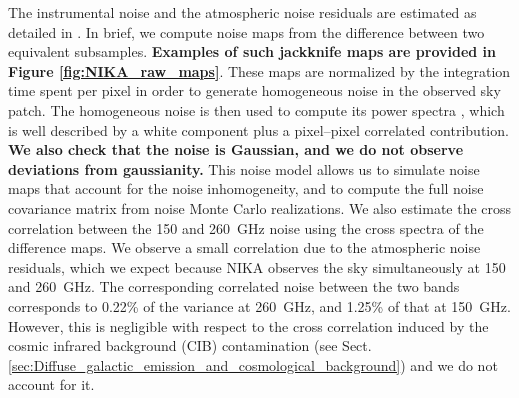 \documentclass[twocolumn,traditabstract]{aa}
\begin{document}
The instrumental noise and the atmospheric noise residuals are estimated as detailed in \cite{Adam2016}. In brief, we compute noise maps from the difference between two equivalent subsamples. {\bf Examples of such jackknife maps are provided in Figure \ref{fig:NIKA_raw_maps}}. These maps are normalized by the integration time spent per pixel in order to generate homogeneous noise in the observed sky patch. The homogeneous noise is then used to compute its power spectra \cite[using the POKER software,][]{Ponthieu2011}, which is well described by a white component plus a pixel--pixel correlated contribution. {\bf We also check that the noise is Gaussian, and we do not observe deviations from gaussianity.} This noise model allows us to simulate noise maps that account for the noise inhomogeneity, and to compute the full noise covariance matrix from noise Monte Carlo realizations. We also estimate the cross correlation between the 150 and 260~GHz noise using the cross spectra of the difference maps. We observe a small correlation due to the atmospheric noise residuals, which we expect because NIKA observes the sky simultaneously at 150 and 260~GHz. The corresponding correlated noise between the two bands corresponds to 0.22\% of the variance at 260~GHz, and 1.25\% of that at 150~GHz. However, this is negligible with respect to the cross correlation induced by the cosmic infrared background (CIB) contamination (see Sect.~ \ref{sec:Diffuse_galactic_emission_and_cosmological_background}) and we do not account for it.

\end{document}
